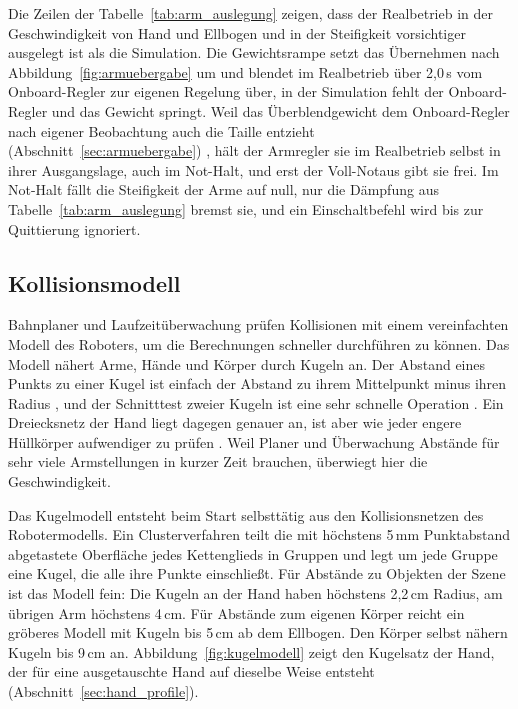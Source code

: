 Die Zeilen der Tabelle~\ref{tab:arm_auslegung} zeigen, dass der Realbetrieb in der Geschwindigkeit von Hand und Ellbogen und in der Steifigkeit vorsichtiger ausgelegt ist als die Simulation.
Die Gewichtsrampe setzt das Übernehmen nach Abbildung~\ref{fig:armuebergabe} um und blendet im Realbetrieb über 2,0\,s vom Onboard-Regler zur eigenen Regelung über, in der Simulation fehlt der Onboard-Regler und das Gewicht springt.
Weil das Überblendgewicht dem Onboard-Regler nach eigener Beobachtung auch die Taille entzieht (Abschnitt~\ref{sec:armuebergabe}) , hält der Armregler sie im Realbetrieb selbst in ihrer Ausgangslage, auch im Not-Halt, und erst der Voll-Notaus gibt sie frei.
Im Not-Halt fällt die Steifigkeit der Arme auf null, nur die Dämpfung aus Tabelle~\ref{tab:arm_auslegung} bremst sie, und ein Einschaltbefehl wird bis zur Quittierung ignoriert.

\subsection{Kollisionsmodell}
\label{sec:kollisionsmodell}
Bahnplaner und Laufzeitüberwachung prüfen Kollisionen mit einem vereinfachten Modell des Roboters, um die Berechnungen schneller durchführen zu können.
Das Modell nähert Arme, Hände und Körper durch Kugeln an.
Der Abstand eines Punkts zu einer Kugel ist einfach der Abstand zu ihrem Mittelpunkt minus ihren Radius \cite{Zucker2013}, und der Schnitttest zweier Kugeln ist eine sehr schnelle Operation \cite{Hubbard1996}.
Ein Dreiecksnetz der Hand liegt dagegen genauer an, ist aber wie jeder engere Hüllkörper aufwendiger zu prüfen \cite{LaValle2006}.
Weil Planer und Überwachung Abstände für sehr viele Armstellungen in kurzer Zeit brauchen, überwiegt hier die Geschwindigkeit.

Das Kugelmodell entsteht beim Start selbsttätig aus den Kollisionsnetzen des Robotermodells.
Ein Clusterverfahren teilt die mit höchstens 5\,mm Punktabstand abgetastete Oberfläche jedes Kettenglieds in Gruppen und legt um jede Gruppe eine Kugel, die alle ihre Punkte einschließt.
Für Abstände zu Objekten der Szene ist das Modell fein: Die Kugeln an der Hand haben höchstens 2,2\,cm Radius, am übrigen Arm höchstens 4\,cm.
Für Abstände zum eigenen Körper reicht ein gröberes Modell mit Kugeln bis 5\,cm ab dem Ellbogen.
Den Körper selbst nähern Kugeln bis 9\,cm an.
Abbildung~\ref{fig:kugelmodell} zeigt den Kugelsatz der Hand, der für eine ausgetauschte Hand auf dieselbe Weise entsteht (Abschnitt~\ref{sec:hand_profile}).

